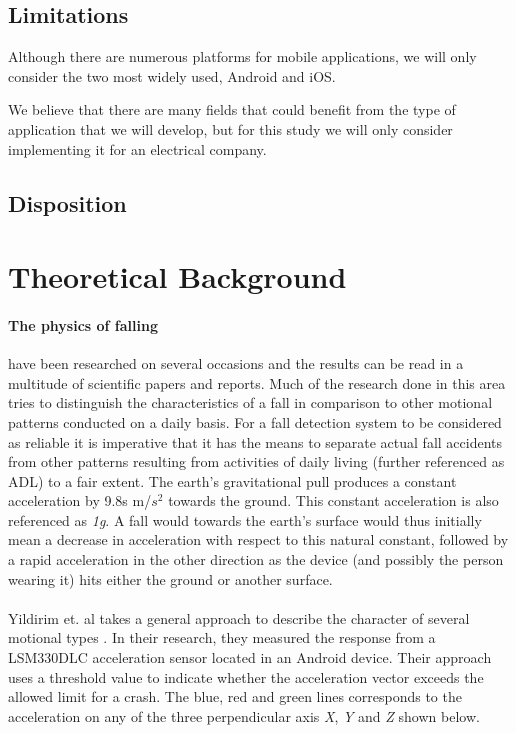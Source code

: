 \documentclass[12pt, a4paper, onecolumn]{article}
\begin{document}
		\subsection{Limitations}
		
		Although there are numerous platforms for mobile applications, we will only consider the two most widely used, Android and iOS.
		
		We believe that there are many fields that could benefit from the type of application that we will develop, but for this study we will only consider implementing it for an electrical company.
		
		\subsection{Disposition}
		
	\newpage
	
	\section{Theoretical Background}
	
	\paragraph{The physics of falling} have been researched on several occasions and the results can be read in a multitude of scientific papers and reports. Much of the research done in this area tries to distinguish the characteristics of a fall in comparison to other motional patterns conducted on a daily basis. For a fall detection system to be considered as reliable it is imperative that it has the means to separate actual fall accidents from other patterns resulting from activities of daily living (further referenced as ADL) to a fair extent. The earth's gravitational pull produces a constant acceleration by 9.8s m/$s^{2}$ towards the ground. This constant acceleration is also referenced as \textit{1g}. A fall would towards the earth's surface would thus initially mean a decrease in acceleration with respect to this natural constant, followed by a rapid acceleration in the other direction as the device (and possibly the person wearing it) hits either the ground or another surface.
	
	
	\paragraph{} Yildirim et. al takes a general approach to describe the character of several motional types \cite{int_journ}. In their research, they measured the response from a LSM330DLC acceleration sensor located in an Android device. Their approach uses a threshold value to indicate whether the acceleration vector exceeds the allowed limit for a crash. The blue, red and green lines corresponds to the acceleration on any of the three perpendicular axis \textit{X}, \textit{Y} and \textit{Z} shown below.
	
\end{document}
